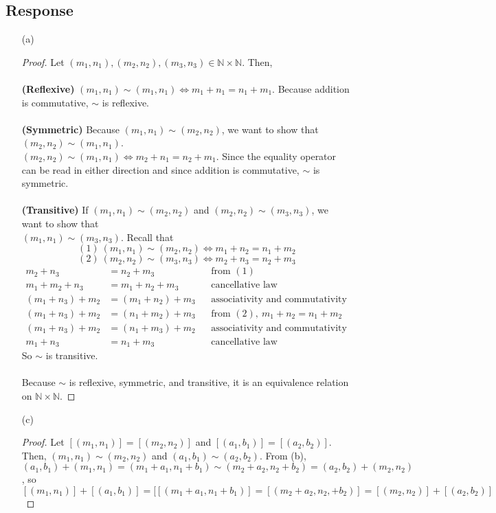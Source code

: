 \documentclass[13pt]{article}
\begin{document}
\subsection*{Response}
\begin{enumerate}
\item [(a)]
  \begin{proof}
    Let $(m_1, n_1), (m_2, n_2), (m_3, n_3) \in \mathbb{N} \times \mathbb{N}$. Then, \\ \\
    \textbf{(Reflexive)} $(m_1, n_1) \sim (m_1, n_1) \iff m_1 + n_1 = n_1 + m_1$. Because addition is
    commutative, $\sim$ is reflexive. \\ \\
    \textbf{(Symmetric)} Because $(m_1, n_1) \sim (m_2, n_2)$, we want to show that $(m_2, n_2) \sim (m_1, n_1)$.
    \\ $(m_2, n_2) \sim (m_1, n_1) \iff m_2 + n_1 = n_2 + m_1$. Since the equality operator can be read in either
    direction and since addition is commutative, $\sim$ is symmetric. \\ \\
    \textbf{(Transitive)} If $(m_1, n_1) \sim (m_2, n_2)$ and $(m_2, n_2) \sim (m_3, n_3)$, we want to show that
    \\ $(m_1, n_1) \sim (m_3, n_3)$. Recall that
    \[(1)\ (m_1, n_1) \sim (m_2, n_2) \iff m_1 + n_2 = n_1 + m_2\]
    \[(2)\ (m_2, n_2) \sim (m_3, n_3) \iff m_2 + n_3 = n_2 + m_3\]
    \begin{align*}
      m_2 + n_3 &= n_2 + m_3 && \text{from }(1) \\
      m_1 + m_2 + n_3 &= m_1 + n_2 + m_3 && \text{cancellative law} \\
      (m_1 + n_3) + m_2 &= (m_1 + n_2) + m_3 && \text{associativity and commutativity of addition} \\
      (m_1 + n_3) + m_2 &= (n_1 + m_2) + m_3 && \text{from } (2), \ m_1 + n_2 = n_1 + m_2 \\
      (m_1 + n_3) + m_2 &= (n_1 + m_3) + m_2 && \text{associativity and commutativity of addition} \\
      m_1 + n_3 &= n_1 + m_3 && \text{cancellative law}
    \end{align*}
    So $\sim$ is transitive. \\ \\
    Because $\sim$ is reflexive, symmetric, and transitive, it is an equivalence relation on $\mathbb{N} \times
    \mathbb{N}$.
  \end{proof}
\item [(c)]
  \begin{proof}
    Let $[(m_1, n_1)] = [(m_2, n_2)]$ and $[(a_1, b_1)] = [(a_2, b_2)]$. Then, $(m_1, n_1) \sim (m_2, n_2)$ and
    $(a_1, b_1) \sim (a_2, b_2)$. From (b), $(a_1, b_1) + (m_1, n_1) = (m_1 + a_1, n_1 + b_1) \sim
    (m_2 + a_2, n_2 + b_2) = (a_2, b_2) + (m_2, n_2)$, so
    $[(m_1, n_1)] + [(a_1, b_1)] = [[(m_1 + a_1, n_1 + b_1)] = [(m_2 + a_2, n_2, + b_2)] = [(m_2, n_2)] + [(a_2, b_2)]$
  \end{proof}


\end{enumerate}
\end{document}

